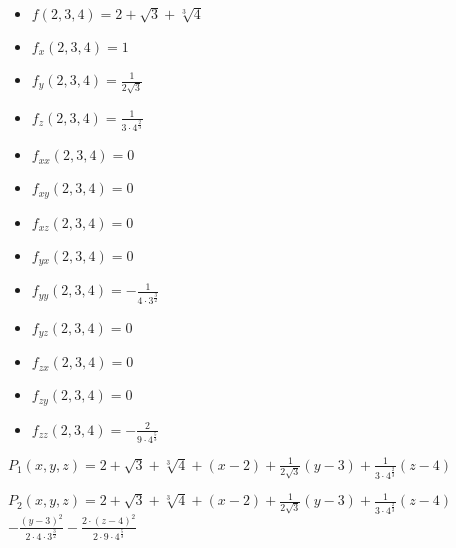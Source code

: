 \documentclass[../practica_05.tex]{subfiles}
\begin{document}
\begin{enumerate}
            \begin{itemize}
                \item $f(2,3,4) = 2 + \sqrt{3} + \sqrt[3]{4}$
                \item $f_{x}(2,3,4) = 1$
                \item $f_{y}(2,3,4) = \frac{1}{2\sqrt{3}} $
                \item $f_{z}(2,3,4) = \frac{1}{3\cdot 4^{\frac{2}{3}}} $
                \item $f_{xx}(2,3,4) = 0 $
                \item $f_{xy}(2,3,4) = 0 $
                \item $f_{xz}(2,3,4) = 0 $
                \item $f_{yx}(2,3,4) = 0 $
                \item $f_{yy}(2,3,4) = -\frac{1}{4\cdot 3^{\frac{3}{2}}} $
                \item $f_{yz}(2,3,4) = 0 $
                \item $f_{zx}(2,3,4) = 0 $
                \item $f_{zy}(2,3,4) = 0 $
                \item $f_{zz}(2,3,4) = -\frac{2}{9\cdot 4^{\frac{5}{3}}} $
            \end{itemize}

            $P_1(x,y,z) = 2 + \sqrt{3} + \sqrt[3]{4} + (x-2) + \frac{1}{2\sqrt{3}}(y-3) + \frac{1}{3\cdot 4^{\frac{2}{3}}}(z-4) $

            $P_2(x,y,z) = 2 + \sqrt{3} + \sqrt[3]{4} + (x-2) + \frac{1}{2\sqrt{3}}(y-3) + \frac{1}{3\cdot 4^{\frac{2}{3}}}(z-4) $
            $ -\frac{(y-3)^2}{2\cdot 4\cdot 3^{\frac{3}{2}}} - \frac{2\cdot (z-4)^2}{2 \cdot 9\cdot 4^{\frac{5}{3}}}$

    \end{enumerate}
\end{document}
